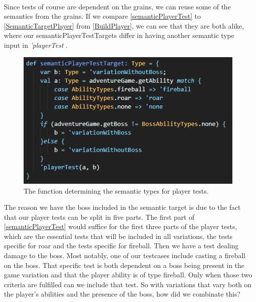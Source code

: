 \\
Since tests of course are dependent on the grains, we can reuse some of the semantics from the grains. If we compare \autoref{semanticPlayerTest} to \autoref{SemanticTargetPlayer} from \autoref{BuildPlayer}, we can see that they are both alike, where our semanticPlayerTestTargets differ in having another semantic type input in \textit{'playerTest} . 
\begin{figure}[h]
    \centering
    \includegraphics[width=0.7\linewidth]{Materials/TestingDiscussion/SemanticPlayerTestTarget}
    \caption{The function determining the semantic types for player tests.}
    \label{semanticPlayerTest}
\end{figure}
The reason we have the boss included in the semantic target is due to the fact that our player tests can be split in five parts. The first part  of \autoref{semanticPlayerTest} would suffice for the first three parts of the player tests, which are the essential tests that will be included in all variations, the tests specific for roar and the tests specific for fireball. Then we have a test dealing damage to the boss. Most notably, one of our testcases include casting a fireball on the boss. That specific test is both dependent on a boss being present in the game variation and that the player ability is of type fireball. Only when those two criteria are fulfilled can we include that test. So with variations that vary both on the player's abilities and the presence of the boss, how did we combinate this? \\
